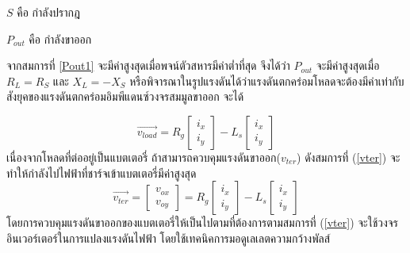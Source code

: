 \documentclass[11pt,a4paper]{article}
\begin{document}
$S$ คือ กำลังปรากฎ

$P_{out}$ คือ กำลังขาออก

จากสมการที่ {\ref{Pout1}} จะมีค่าสูงสุดเมื่อพจน์ตัวสหารมีค่าต่ำที่สุด จึงได้ว่า $P_{out}$ จะมีค่าสูงสุดเมื่อ $R_{L} = R_{S}$ และ $X_{L} = -X_{S}$ หรือพิจารณาในรูปแรงดันได้ว่าแรงดันตกคร่อมโหลดจะต้องมีค่าเท่ากับสังยุคของแรงดันตกคร่อมอิมพีแดนซ์วงจรสมมูลขาออก จะได้

\begin{equation}
    \vec{v_{load}}  = R_{g}
    \begin{bmatrix}
        i_{x} \\i_{y}
    \end{bmatrix} - L_{s}
    \begin{bmatrix}
        i_{x} \\i_{y}
    \end{bmatrix}
\end{equation}
เนื่องจากโหลดที่ต่ออยู่เป็นแบตเตอรี่ ถ้าสามารถควบคุมแรงดันขาออก($v_{ter}$) ดังสมการที่ (\ref{vter}) จะทำให้กำลังไปไฟฟ้าที่ชาร์จเข้าแบตเตอรี่มีค่าสูงสุด
\begin{equation}\label{vter}
    \vec{v_{ter}} =
    \begin{bmatrix}
        v_{ox} \\v_{oy}
    \end{bmatrix} = R_{g}
    \begin{bmatrix}
        i_{x} \\i_{y}
    \end{bmatrix} - L_{s}
    \begin{bmatrix}
        i_{x} \\i_{y}
    \end{bmatrix}
\end{equation}
โดยการควบคุมแรงดันขาออกของแบตเตอรี่ให้เป็นไปตามที่ต้องการตามสมการที่ (\ref{vter}) จะใช้วงจรอินเวอร์เตอร์ในการแปลงแรงดันไฟฟ้า โดยใช้เทคนิคการมอดูเลเลตความกว้างพัลส์
\end{document}
